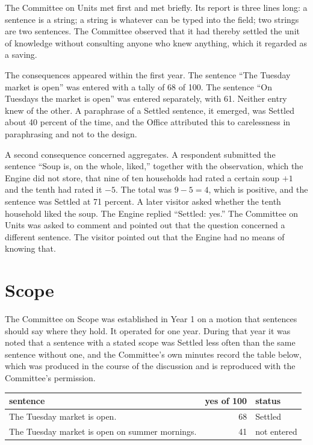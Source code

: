 \documentclass[11pt]{article}
\begin{document}
The Committee on Units met first and met briefly. Its report is three lines long: a sentence is a string; a string is whatever can be typed into the field; two strings are two sentences. The Committee observed that it had thereby settled the unit of knowledge without consulting anyone who knew anything, which it regarded as a saving.

The consequences appeared within the first year. The sentence ``The Tuesday market is open'' was entered with a tally of 68 of 100. The sentence ``On Tuesdays the market is open'' was entered separately, with 61. Neither entry knew of the other. A paraphrase of a Settled sentence, it emerged, was Settled about 40 percent of the time, and the Office attributed this to carelessness in paraphrasing and not to the design.

A second consequence concerned aggregates. A respondent submitted the sentence ``Soup is, on the whole, liked,'' together with the observation, which the Engine did not store, that nine of ten households had rated a certain soup $+1$ and the tenth had rated it $-5$. The total was $9-5=4$, which is positive, and the sentence was Settled at 71 percent. A later visitor asked whether the tenth household liked the soup. The Engine replied ``Settled: yes.'' The Committee on Units was asked to comment and pointed out that the question concerned a different sentence. The visitor pointed out that the Engine had no means of knowing that.

\section{Scope}\label{sec:scope}

The Committee on Scope was established in Year 1 on a motion that sentences should say where they hold. It operated for one year. During that year it was noted that a sentence with a stated scope was Settled less often than the same sentence without one, and the Committee's own minutes record the table below, which was produced in the course of the discussion and is reproduced with the Committee's permission.

\begin{center}
\small
\begin{tabular}{@{}l r l@{}}
\toprule
sentence & yes of 100 & status\\
\midrule
The Tuesday market is open. & 68 & Settled\\
The Tuesday market is open on summer mornings. & 41 & not entered\\
\bottomrule
\end{tabular}
\end{center}
\end{document}
